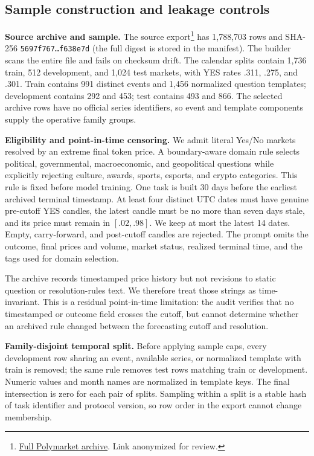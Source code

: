 \subsection{Sample construction and leakage controls}

\noindent\textbf{Source archive and sample.}
The source export\footnote{%
  \;%
  \href{https://huggingface.co/datasets/anonymous-review/polymarket-full-market-data}%
  {Full Polymarket archive}. Link anonymized for review.%
} has 1,788,703 rows and SHA-256
\texttt{5697f767\ldots f638e7d} (the full digest is stored in the manifest).
The builder scans the entire file and fails on checksum drift. The calendar
splits contain 1,736 train, 512 development, and 1,024 test markets, with YES rates
.311, .275, and .301. Train contains 991 distinct events and 1,456 normalized
question templates; development contains 292 and 453; test contains 493 and 866.
The selected archive rows have no official series identifiers, so event and
template components supply the operative family groups.

\noindent\textbf{Eligibility and point-in-time censoring.}
We admit literal Yes/No markets resolved by an extreme final token price. A
boundary-aware domain rule selects political, governmental, macroeconomic, and
geopolitical questions while explicitly rejecting culture, awards, sports,
esports, and crypto categories. This rule is fixed before model training. One task
is built 30 days before the earliest archived terminal timestamp. At least four
distinct UTC dates must have genuine pre-cutoff YES candles, the latest candle must
be no more than seven days stale, and its price must remain in $[.02,.98]$. We keep
at most the latest 14 dates. Empty, carry-forward, and post-cutoff candles are
rejected. The prompt omits the outcome, final prices and volume, market status,
realized terminal time, and the tags used for domain selection.

The archive records timestamped price history but not revisions to static question
or resolution-rules text. We therefore treat those strings as time-invariant. This
is a residual point-in-time limitation: the audit verifies that no timestamped or
outcome field crosses the cutoff, but cannot determine whether an archived rule
changed between the forecasting cutoff and resolution.

\noindent\textbf{Family-disjoint temporal split.}
Before applying sample caps, every development row sharing an event, available
series, or normalized template with train is removed; the same rule removes test
rows matching train or development. Numeric values and month names are normalized
in template keys. The final intersection is zero for each pair of splits. Sampling
within a split is a stable hash of task identifier and protocol version, so row
order in the export cannot change membership.


